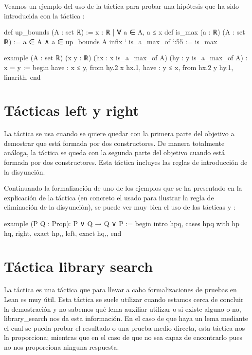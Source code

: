 Veamos un ejemplo del uso de la táctica  para probar una
hipótesis que ha sido introducida con la táctica :

\begin{leancode}
def up_bounds (A : set ℝ) := { x : ℝ | ∀ a ∈ A, a ≤ x}
def is_max (a : ℝ) (A : set ℝ) := a ∈ A ∧ a ∈ up_bounds A
infix ` is_a_max_of `:55 := is_max

example (A : set ℝ) (x y : ℝ) (hx : x is_a_max_of A) (hy : y is_a_max_of A) :
x = y :=
begin
  have : x ≤ y, from hy.2 x hx.1,
  have : y ≤ x, from hx.2 y hy.1,
  linarith,
end
\end{leancode}

\section{Tácticas left y right}

La táctica  se usa cuando se quiere quedar con la
primera parte del objetivo a demostrar que está formada por dos constructores.
De manera totalmente análoga, la táctica  se queda
con la segunda parte del objetivo cuando está formada por dos
constructores. Esta táctica incluyes las reglas de introducción de la
disyunción.

Continuando la formalización de uno de los ejemplos que se ha presentado en la
explicación de la táctica  (en concreto el usado para
ilustrar la regla de eliminación de la disyunción), se puede ver muy bien el
uso de las tácticas  y :
\begin{leancode}
example (P Q : Prop): P ∨ Q → Q ∨ P :=
begin
  intro hpq,
  cases hpq with hp hq,
  { right,
    exact hp,},
  { left,
    exact hq,},
end
\end{leancode}

\section{Táctica library search}

La táctica  es una táctica que
para llevar a cabo formalizaciones de pruebas en Lean es muy útil. Esta
táctica se suele utilizar cuando estamos cerca de concluir la
demostración y no sabemos qué lema auxiliar utilizar o si existe alguno
o no,  {library\_search} nos da esta
información. En el caso de que haya un lema mediante el cual se pueda
probar el resultado o una prueba medio directa, esta táctica nos la
proporciona; mientras que en el caso de que no sea capaz de encontrarlo
pues no nos proporciona ninguna respuesta.

